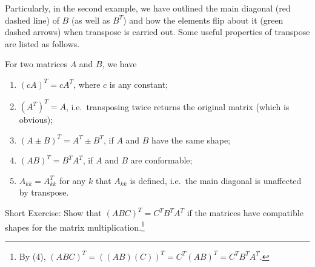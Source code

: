 Particularly, in the second example, we have outlined the main diagonal (red dashed line) of $B$ (as well as $B^T$) and how the elements flip about it (green dashed arrows) when transpose is carried out. Some useful properties of transpose are listed as follows.
\begin{proper}
\label{proper:transp}
For two matrices $A$ and $B$, we have
\begin{enumerate}
\item $(cA)^T = cA^T$, where $c$ is any constant;
\item $(A^T)^T = A$, i.e.\ transposing twice returns the original matrix (which is obvious);
\item $(A \pm B)^T = A^T \pm B^T$, if $A$ and $B$ have the same shape;
\item $(AB)^T = B^TA^T$, if $A$ and $B$ are conformable;
\item $A_{kk} = A^T_{kk}$ for any $k$ that $A_{kk}$ is defined, i.e.\ the main diagonal is unaffected by transpose.
\end{enumerate}
\end{proper}
Short Exercise: Show that $(ABC)^T = C^TB^TA^T$ if the matrices have compatible shapes for the matrix multiplication.\footnote{By (4), $(ABC)^T = ((AB)(C))^T = C^T(AB)^T = C^TB^TA^T$.}

